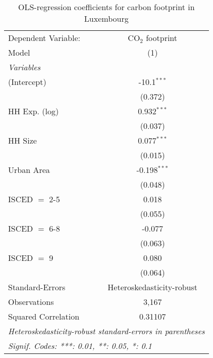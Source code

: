 
\begin{table}[htbp!]
   \centering
   \small
   \begin{adjustbox}{width = 1\textwidth, max height = 0.95\textheight, center}
      \begin{threeparttable}[b]
         \caption{\label{tab:OLS_2_LUX} OLS-regression coefficients for carbon footprint in Luxembourg}
         \begin{tabular}{lc}
            \tabularnewline \midrule \midrule
            Dependent Variable: & CO$_{2}$ footprint\\  
            Model               & (1)\\  
            \midrule
            \emph{Variables}\\
            (Intercept)         & -10.1$^{***}$\\   
                                & (0.372)\\   
            HH Exp. (log)       & 0.932$^{***}$\\   
                                & (0.037)\\   
            HH Size             & 0.077$^{***}$\\   
                                & (0.015)\\   
            Urban Area          & -0.198$^{***}$\\   
                                & (0.048)\\   
            ISCED $=$ 2-5       & 0.018\\   
                                & (0.055)\\   
            ISCED $=$ 6-8       & -0.077\\   
                                & (0.063)\\   
            ISCED $=$ 9         & 0.080\\   
                                & (0.064)\\   
            \midrule 
            Standard-Errors     & Heteroskedasticity-robust \\   
            Observations        & 3,167\\  
            Squared Correlation & 0.31107\\  
            \midrule \midrule
            \multicolumn{2}{l}{\emph{Heteroskedasticity-robust standard-errors in parentheses}}\\
            \multicolumn{2}{l}{\emph{Signif. Codes: ***: 0.01, **: 0.05, *: 0.1}}\\
         \end{tabular}
         

\end{threeparttable}
\end{adjustbox}
\end{table}
